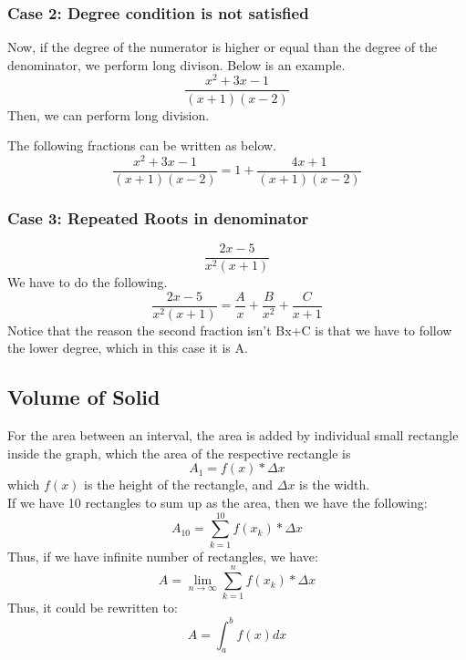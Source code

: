 \documentclass{article}
\begin{document}
\subsubsection{Case 2: Degree condition is not satisfied}
Now, if the degree of the numerator is higher or equal than the degree of the denominator, we perform long divison. Below is an example.
\begin{equation*}
  \frac{x^2+3x-1}{(x+1)(x-2)}
\end{equation*}
Then, we can perform long division.\\
\begin{center}
\end{center}
The following fractions can be written as below.
\begin{equation*}
  \frac{x^2+3x-1}{(x+1)(x-2)} = 1 + \frac{4x+1}{(x+1)(x-2)}
\end{equation*}
\subsubsection{Case 3: Repeated Roots in denominator}
\begin{equation*}
  \frac{2x-5}{x^2(x+1)}
\end{equation*}
We have to do the following.
\begin{equation*} 
  \frac{2x-5}{x^2(x+1)} = \frac{A}{x} + \frac{B}{x^2} + \frac{C}{x+1}
\end{equation*}
Notice that the reason the second fraction isn't Bx+C is that we have to follow the lower degree, which in this case it is A.
\subsection{Volume of Solid}
For the area between an interval, the area is added by individual small rectangle inside the graph, which the area of the respective rectangle is
\begin{equation*}
  A_1 = f(x) * \Delta x
\end{equation*}
which $f(x)$ is the height of the rectangle, and $\Delta x$ is the width.\\
If we have 10 rectangles to sum up as the area, then we have the following:
\begin{equation*}
  A_{10} = \sum_{k=1}^{10} f(x_k) * \Delta x
\end{equation*}
Thus, if we have infinite number of rectangles, we have:
\begin{equation*}
  A = \lim_{n\to \infty} \sum_{k=1}^{n} f(x_k) * \Delta x
\end{equation*}
Thus, it could be rewritten to:
\begin{equation*}
  A = \int_{a}^{b} f(x) dx
\end{equation*}
\end{document}
